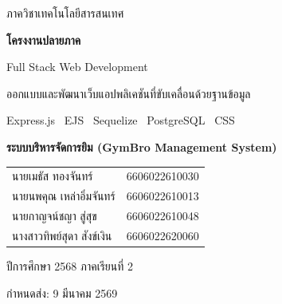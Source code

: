 \documentclass[10pt]{report}
\begin{document}
\sloppy

\begin{titlepage}
    \centering
    \vspace*{1cm}
    
    {\Large ภาควิชาเทคโนโลยีสารสนเทศ \par}
    \vspace{1.5cm}
    
    {\Huge \bfseries โครงงานปลายภาค \par}
    \vspace{0.5cm}
    
    {\LARGE Full Stack Web Development \par}
    \vspace{0.3cm}
    {\Large ออกแบบและพัฒนาเว็บแอปพลิเคชันที่ขับเคลื่อนด้วยฐานข้อมูล \par}
    \vspace{0.5cm}
    
    {\large Express.js \textbar\ EJS \textbar\ Sequelize \textbar\ PostgreSQL \textbar\ CSS \par}
    \vspace{2cm}
    
    {\Large \bfseries ระบบบริหารจัดการยิม (GymBro Management System) \par}
    \vspace{1.5cm}
    
    {\large
    \begin{tabular}{ll}
        นายเมธัส ทองจันทร์ & 6606022610030 \\
        นายนพคุณ เหล่าอิ่มจันทร์ & 6606022610013 \\
        นายกาญจน์ชญา สู่สุข & 6606022610048 \\
        นางสาวทิพย์สุดา สังข์เงิน & 6606022620060 \\
    \end{tabular}
    \par}
    \vfill
    
    {\Large ปีการศึกษา 2568 ภาคเรียนที่ 2 \par}
    {\Large กำหนดส่ง: 9 มีนาคม 2569 \par}
    
    \vspace*{1cm}
\end{titlepage}
\tableofcontents
\newpage

\end{document}
